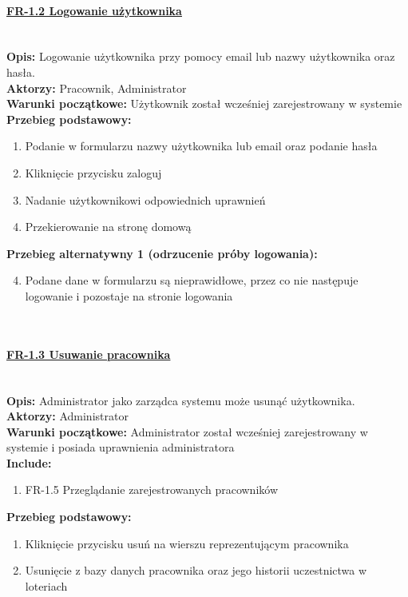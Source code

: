 \paragraph{\underline{FR-1.2 Logowanie użytkownika}}\mbox{}\\[1mm]
	\noindent\textbf{Opis:} Logowanie użytkownika przy pomocy email lub nazwy użytkownika oraz hasła.\\
	\noindent\textbf{Aktorzy:} Pracownik, Administrator\\
	\textbf{Warunki początkowe:} Użytkownik został wcześniej zarejestrowany w systemie\\
	\textbf{Przebieg podstawowy:}
	\begin{enumerate}[noparskip]
		\item Podanie w formularzu nazwy użytkownika lub email oraz podanie hasła
    \item Kliknięcie przycisku zaloguj
		\item Nadanie użytkownikowi odpowiednich uprawnień
		\item Przekierowanie na stronę domową
	\end{enumerate} 
	\indent \textbf{Przebieg alternatywny 1 (odrzucenie próby logowania):}
	\begin{enumerate}[noparskip]\setcounter{enumi}{3}
		\item Podane dane w formularzu są nieprawidłowe, przez co nie następuje logowanie i pozostaje na stronie logowania
	\end{enumerate}	\mbox{}\\[-11mm]

\paragraph{\underline{FR-1.3 Usuwanie pracownika}}\mbox{}\\[1mm]
	\noindent\textbf{Opis:}	Administrator jako zarządca systemu może usunąć użytkownika.\\
	\noindent\textbf{Aktorzy:} Administrator\\
	\textbf{Warunki początkowe:} Administrator został wcześniej zarejestrowany w systemie i posiada uprawnienia administratora\\
	\textbf{Include:} 
	\begin{enumerate}[noparskip]
		\item FR-1.5 Przeglądanie zarejestrowanych pracowników	
	\end{enumerate}
  \textbf{Przebieg podstawowy:}
	\begin{enumerate}[noparskip]
		\item Kliknięcie przycisku usuń na wierszu reprezentującym pracownika
    \item Usunięcie z bazy danych pracownika oraz jego historii uczestnictwa w loteriach
	\end{enumerate} \mbox{}\\[-11mm]

